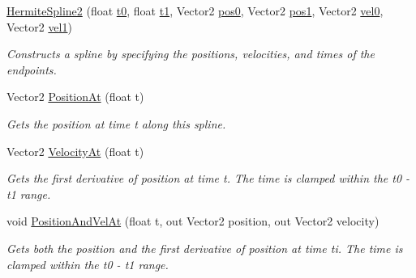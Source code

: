 \begin{DoxyCompactItemize}
\mbox{\hyperlink{struct_leap_1_1_unity_1_1_animation_1_1_hermite_spline2_ab9e9d6ab0f7c366b3896e5905a405648}{Hermite\+Spline2}} (float \mbox{\hyperlink{struct_leap_1_1_unity_1_1_animation_1_1_hermite_spline2_abeb145d4108689c6f4fcb55ced2d6639}{t0}}, float \mbox{\hyperlink{struct_leap_1_1_unity_1_1_animation_1_1_hermite_spline2_af8478246aa4cce249769aba7f45f4e10}{t1}}, Vector2 \mbox{\hyperlink{struct_leap_1_1_unity_1_1_animation_1_1_hermite_spline2_a34b8ac4e587d68ca8a12eb4bd0b49173}{pos0}}, Vector2 \mbox{\hyperlink{struct_leap_1_1_unity_1_1_animation_1_1_hermite_spline2_a208182486711483ef684285a1df65fc7}{pos1}}, Vector2 \mbox{\hyperlink{struct_leap_1_1_unity_1_1_animation_1_1_hermite_spline2_a14cb5f29c619abcd0cb6d11ba3fb6b40}{vel0}}, Vector2 \mbox{\hyperlink{struct_leap_1_1_unity_1_1_animation_1_1_hermite_spline2_a430d3b4dfb7c08fbaff770671eb42eb4}{vel1}})
\begin{DoxyCompactList}\small\item\em Constructs a spline by specifying the positions, velocities, and times of the endpoints. \end{DoxyCompactList}\item 
Vector2 \mbox{\hyperlink{struct_leap_1_1_unity_1_1_animation_1_1_hermite_spline2_a042056e2d33965a7b2101f1a9b78b5e7}{Position\+At}} (float t)
\begin{DoxyCompactList}\small\item\em Gets the position at time t along this spline. \end{DoxyCompactList}\item 
Vector2 \mbox{\hyperlink{struct_leap_1_1_unity_1_1_animation_1_1_hermite_spline2_a77bfc75b6d8f06124dbded5928e23140}{Velocity\+At}} (float t)
\begin{DoxyCompactList}\small\item\em Gets the first derivative of position at time t. The time is clamped within the t0 -\/ t1 range. \end{DoxyCompactList}\item 
void \mbox{\hyperlink{struct_leap_1_1_unity_1_1_animation_1_1_hermite_spline2_ac3f9bec89052e73ed010005e8d965ecc}{Position\+And\+Vel\+At}} (float t, out Vector2 position, out Vector2 velocity)
\begin{DoxyCompactList}\small\item\em Gets both the position and the first derivative of position at time ti. The time is clamped within the t0 -\/ t1 range. \end{DoxyCompactList}\end{DoxyCompactItemize}
